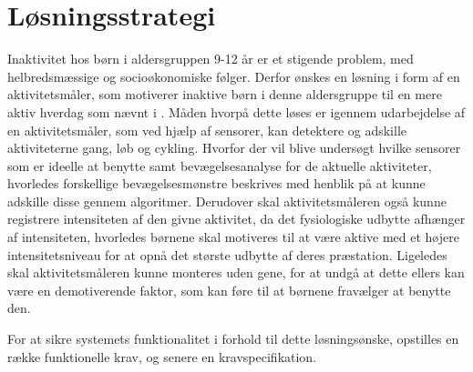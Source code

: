 \section{Løsningsstrategi}


%



Inaktivitet hos børn i aldersgruppen 9-12 år er et stigende problem, med helbredsmæssige og socioøkonomiske følger. Derfor ønskes en løsning i form af en aktivitetsmåler, som motiverer inaktive børn i denne aldersgruppe til en mere aktiv hverdag som nævnt i . 
Måden hvorpå dette løses er igennem udarbejdelse af en aktivitetsmåler, som ved hjælp af sensorer, kan detektere og adskille aktiviteterne gang, løb og cykling. Hvorfor der vil blive undersøgt hvilke sensorer som er ideelle at benytte samt bevægelsesanalyse for de aktuelle aktiviteter, hvorledes forskellige bevægelsesmønstre beskrives med henblik på at kunne adskille disse gennem algoritmer. Derudover skal aktivitetsmåleren også kunne registrere intensiteten af den givne aktivitet, da det fysiologiske udbytte afhænger af intensiteten, hvorledes børnene skal motiveres til at være aktive med et højere intensitetsniveau for at opnå det største udbytte af deres præstation. 
Ligeledes skal aktivitetsmåleren kunne monteres uden gene, for at undgå at dette ellers kan være en demotiverende faktor, som kan føre til at børnene fravælger at benytte den. 

For at sikre systemets funktionalitet i forhold til dette løsningsønske, opstilles en række funktionelle krav, og senere en kravspecifikation.  


